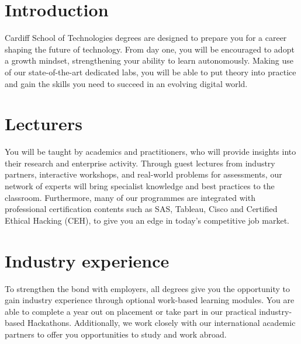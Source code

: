 \documentclass{article}
\begin{document}
\newpage %

\maketitle %

\tableofcontents

\section{Introduction}
Cardiff School of Technologies degrees are designed to prepare you for a
career shaping the future of technology. From day one, you will be
encouraged to adopt a growth mindset, strengthening your ability to learn
autonomously. Making use of our state-of-the-art dedicated labs, you will
be able to put theory into practice and gain the skills you need to succeed
in an evolving digital world.

\section{Lecturers}
You will be taught by academics and practitioners, who will provide insights
into their research and enterprise activity. Through guest lectures from
industry partners, interactive workshops, and real-world problems for
assessments, our network of experts will bring specialist knowledge and best
practices to the classroom. Furthermore, many of our programmes are integrated
with professional certification contents such as SAS, Tableau, Cisco and
Certified Ethical Hacking (CEH), to give you an edge in today’s competitive job
market. 

\section{Industry experience}
To strengthen the bond with employers, all degrees give you the
opportunity to gain industry experience through optional work-based
learning modules. You are able to complete a year out on placement or take
part in our practical industry-based Hackathons. Additionally, we work
closely with our international academic partners to offer you
opportunities to study and work abroad.
\end{document}
